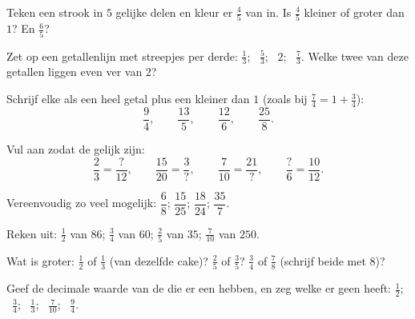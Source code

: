 \begin{exercise}[$\star$]\label{exo:g6:fractions:2}
Teken een strook in $5$ gelijke delen en kleur er $\frac45$ van in. Is
$\frac45$ kleiner of groter dan $1$? En $\frac65$?
\end{exercise}

\begin{exercise}[$\star$]\label{exo:g6:fractions:3}
Zet op een getallenlijn met streepjes per derde: $\frac13$; \ $\frac53$;
\ $2$; \ $\frac73$. Welke twee van deze getallen liggen even ver van $2$?
\end{exercise}

\begin{exercise}[$\star$]\label{exo:g6:fractions:4}
Schrijf elke  als een heel getal plus een  kleiner dan $1$ (zoals
bij $\frac74 = 1 + \frac34$):
\[
\frac{9}{4}, \qquad \frac{13}{5}, \qquad \frac{12}{6}, \qquad
\frac{25}{8} .
\]
\end{exercise}

\begin{exercise}[$\star$]\label{exo:g6:fractions:5}
Vul aan zodat de  gelijk zijn:
\[
\frac{2}{3} = \frac{?}{12}, \qquad
\frac{15}{20} = \frac{3}{?}, \qquad
\frac{7}{10} = \frac{21}{?}, \qquad
\frac{?}{6} = \frac{10}{12}.
\]
\end{exercise}

\begin{exercise}[$\star$]\label{exo:g6:fractions:6}
Vereenvoudig zo veel mogelijk: $\dfrac{6}{8}$; \quad $\dfrac{15}{25}$;
\quad $\dfrac{18}{24}$; \quad $\dfrac{35}{7}$.
\end{exercise}

\begin{exercise}[$\star$]\label{exo:g6:fractions:7}
Reken uit: $\frac12$ van $86$; \quad $\frac34$ van $60$; \quad $\frac25$ van
$35$; \quad $\frac{7}{10}$ van $250$.
\end{exercise}

\begin{exercise}[$\star$]\label{exo:g6:fractions:8}
Wat is groter: $\frac12$ of $\frac13$ (van dezelfde cake)? $\frac25$ of
$\frac35$? $\frac34$ of $\frac78$ (schrijf beide met  $8$)?
\end{exercise}

\begin{exercise}[$\star\star$]\label{exo:g6:fractions:9}
Geef de decimale waarde van de  die er een hebben, en zeg welke 
er geen heeft: $\frac12$; \ $\frac34$; \ $\frac13$; \ $\frac{7}{10}$;
\ $\frac{9}{4}$.
\end{exercise}

